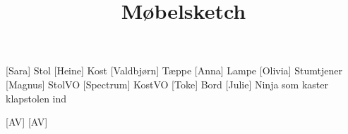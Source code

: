 \documentclass[a4paper,11pt]{article}
\title{Møbelsketch}
\begin{document}
  \maketitle

  \begin{roles}
      [Sara] Stol
      [Heine] Kost
      [Valdbjørn] Tæppe
      [Anna] Lampe
      [Olivia] Stumtjener
      [Magnus] StolVO
      [Spectrum] KostVO
      [Toke] Bord
      [Julie] Ninja som kaster klapstolen ind
  \end{roles}

  \begin{props}
      [AV]
      [AV]
  \end{props}
\end{document}
